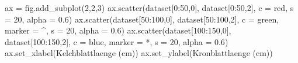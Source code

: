 \documentclass[
  a4paper,
  DIV=11]{scrreprt}
\newenvironment{Shaded}{\begin{snugshade}}{\end{snugshade}}
\newcommand{\DecValTok}[1]{\textcolor[rgb]{0.68,0.00,0.00}{#1}}
\newcommand{\FloatTok}[1]{\textcolor[rgb]{0.68,0.00,0.00}{#1}}
\newcommand{\NormalTok}[1]{\textcolor[rgb]{0.00,0.23,0.31}{#1}}
\newcommand{\OperatorTok}[1]{\textcolor[rgb]{0.37,0.37,0.37}{#1}}
\newcommand{\StringTok}[1]{\textcolor[rgb]{0.13,0.47,0.30}{#1}}
\theoremstyle{definition}
\theoremstyle{definition}
\theoremstyle{remark}
\begin{document}
\begin{Shaded}
\begin{Highlighting}[]
\NormalTok{ax }\OperatorTok{=}\NormalTok{ fig.add\_subplot(}\DecValTok{2}\NormalTok{,}\DecValTok{2}\NormalTok{,}\DecValTok{3}\NormalTok{)}
\NormalTok{ax.scatter(dataset[}\DecValTok{0}\NormalTok{:}\DecValTok{50}\NormalTok{,}\DecValTok{0}\NormalTok{], dataset[}\DecValTok{0}\NormalTok{:}\DecValTok{50}\NormalTok{,}\DecValTok{2}\NormalTok{], }
\NormalTok{            c }\OperatorTok{=} \StringTok{\textquotesingle{}red\textquotesingle{}}\NormalTok{, s }\OperatorTok{=} \DecValTok{20}\NormalTok{, alpha }\OperatorTok{=} \FloatTok{0.6}\NormalTok{)}
\NormalTok{ax.scatter(dataset[}\DecValTok{50}\NormalTok{:}\DecValTok{100}\NormalTok{,}\DecValTok{0}\NormalTok{], dataset[}\DecValTok{50}\NormalTok{:}\DecValTok{100}\NormalTok{,}\DecValTok{2}\NormalTok{], }
\NormalTok{            c }\OperatorTok{=} \StringTok{\textquotesingle{}green\textquotesingle{}}\NormalTok{, marker }\OperatorTok{=} \StringTok{\textquotesingle{}\^{}\textquotesingle{}}\NormalTok{, s }\OperatorTok{=} \DecValTok{20}\NormalTok{, alpha }\OperatorTok{=} \FloatTok{0.6}\NormalTok{)}
\NormalTok{ax.scatter(dataset[}\DecValTok{100}\NormalTok{:}\DecValTok{150}\NormalTok{,}\DecValTok{0}\NormalTok{], dataset[}\DecValTok{100}\NormalTok{:}\DecValTok{150}\NormalTok{,}\DecValTok{2}\NormalTok{], }
\NormalTok{            c }\OperatorTok{=} \StringTok{\textquotesingle{}blue\textquotesingle{}}\NormalTok{, marker }\OperatorTok{=} \StringTok{\textquotesingle{}*\textquotesingle{}}\NormalTok{, s }\OperatorTok{=} \DecValTok{20}\NormalTok{, alpha }\OperatorTok{=} \FloatTok{0.6}\NormalTok{)}
\NormalTok{ax.set\_xlabel(}\StringTok{\textquotesingle{}Kelchblattlaenge (cm)\textquotesingle{}}\NormalTok{)}
\NormalTok{ax.set\_ylabel(}\StringTok{\textquotesingle{}Kronblattlaenge (cm)\textquotesingle{}}\NormalTok{)}


\end{Highlighting}
\end{Shaded}
\end{document}
